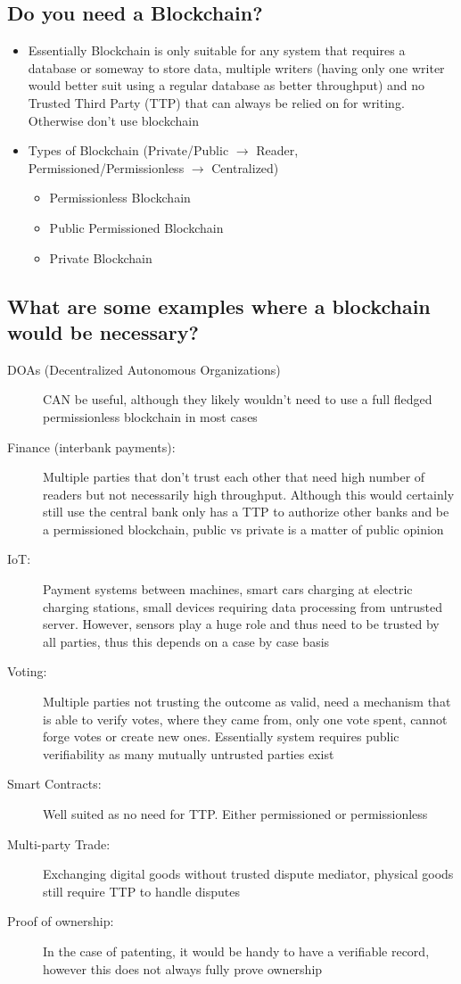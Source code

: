 \documentclass[12pt, a4paper]{report}
\begin{document}
\begin{multicols*}{2}
\chapter{Do you need a Blockchain?}
\begin{itemize}
	\item Essentially Blockchain is only suitable for any system that requires a database or someway to store data, multiple writers (having only one writer would better suit using a regular database as better throughput) and no Trusted Third Party (TTP) that can always be relied on for writing. Otherwise don't use blockchain
	\item Types of Blockchain (Private/Public $\rightarrow$ Reader, Permissioned/Permissionless $\rightarrow$ Centralized)
	\begin{itemize}
		\item Permissionless Blockchain
		\item Public Permissioned Blockchain
		\item Private Blockchain
	\end{itemize}
\end{itemize}
\section{What are some examples where a blockchain would be necessary?}
\begin{description}
	\item[DOAs (Decentralized Autonomous Organizations)] CAN be useful, although they likely wouldn't need to use a full fledged permissionless blockchain in most cases
	\item[Finance (interbank payments):] Multiple parties that don't trust each other that need high number of readers but not necessarily high throughput. Although this would certainly still use the central bank only has a TTP to authorize other banks and be a permissioned blockchain, public vs private is a matter of public opinion
	\item[IoT:] Payment systems between machines, smart cars charging at electric charging stations, small devices requiring data processing from untrusted server. However, sensors play a huge role and thus need to be trusted by all parties, thus this depends on a case by case basis
	\item[Voting:] Multiple parties not trusting the outcome as valid, need a mechanism that is able to verify votes, where they came from, only one vote spent, cannot forge votes or create new ones. Essentially system requires public verifiability as many mutually untrusted parties exist
	\item[Smart Contracts:] Well suited as no need for TTP. Either permissioned or permissionless
	\item[Multi-party Trade:] Exchanging digital goods without trusted dispute mediator, physical goods still require TTP to handle disputes
	\item[Proof of ownership:] In the case of patenting, it would be handy to have a verifiable record, however this does not always fully prove ownership
\end{description}

\end{multicols*}
\end{document}
